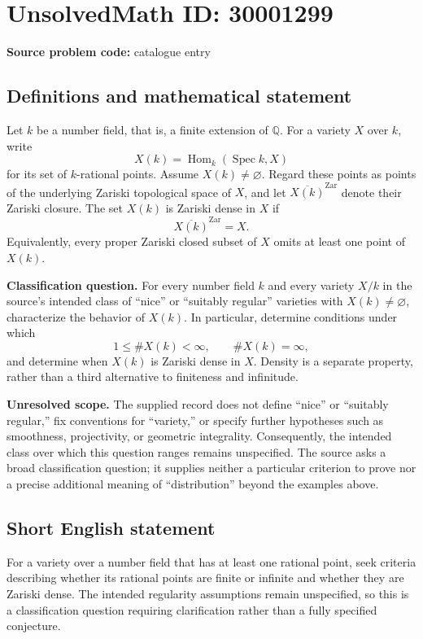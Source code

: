 \documentclass[11pt]{article}
\newcommand{\Q}{\mathbb{Q}}
\begin{document}
\section*{UnsolvedMath ID: 30001299}
\textbf{Source problem code:} catalogue entry
\subsection{Definitions and mathematical statement}
Let \(k\) be a number field, that is, a finite extension of \(\Q\). For a variety \(X\) over \(k\), write
\[
X(k)=\operatorname{Hom}_k(\operatorname{Spec}k,X)
\]
for its set of \(k\)-rational points. Assume \(X(k)\ne\varnothing\). Regard these points as points of the underlying Zariski topological space of \(X\), and let \(\overline{X(k)}^{\mathrm{Zar}}\) denote their Zariski closure. The set \(X(k)\) is Zariski dense in \(X\) if
\[
\overline{X(k)}^{\mathrm{Zar}}=X.
\]
Equivalently, every proper Zariski closed subset of \(X\) omits at least one point of \(X(k)\).

\textbf{Classification question.} For every number field \(k\) and every variety \(X/k\) in the source's intended class of ``nice'' or ``suitably regular'' varieties with \(X(k)\ne\varnothing\), characterize the behavior of \(X(k)\). In particular, determine conditions under which
\[
1\leq \#X(k)<\infty,
\qquad
\#X(k)=\infty,
\]
and determine when \(X(k)\) is Zariski dense in \(X\). Density is a separate property, rather than a third alternative to finiteness and infinitude.

\textbf{Unresolved scope.} The supplied record does not define ``nice'' or ``suitably regular,'' fix conventions for ``variety,'' or specify further hypotheses such as smoothness, projectivity, or geometric integrality. Consequently, the intended class over which this question ranges remains unspecified. The source asks a broad classification question; it supplies neither a particular criterion to prove nor a precise additional meaning of ``distribution'' beyond the examples above.
\subsection{Short English statement}
For a variety over a number field that has at least one rational point, seek criteria describing whether its rational points are finite or infinite and whether they are Zariski dense. The intended regularity assumptions remain unspecified, so this is a classification question requiring clarification rather than a fully specified conjecture.
\end{document}
